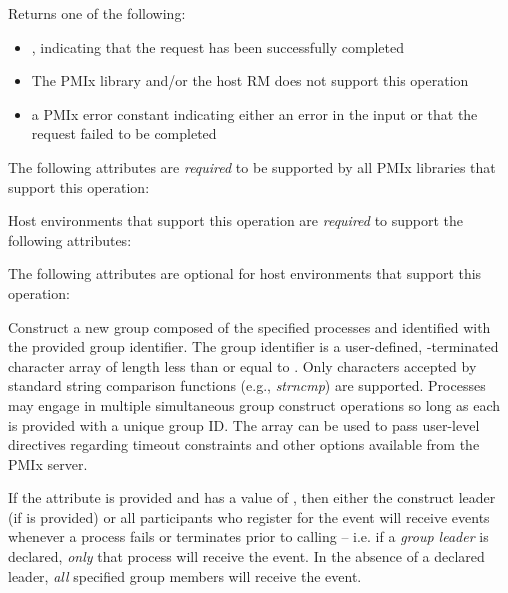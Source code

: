 Returns one of the following:

\begin{itemize}
    \item {}, indicating that the request has been successfully completed
    \item {} The \ac{PMIx} library and/or the host \ac{RM} does not support this operation
    \item a \ac{PMIx} error constant indicating either an error in the input or that the request failed to be completed
\end{itemize}

\reqattrstart
The following attributes are \textit{required} to be supported by all \ac{PMIx} libraries that support this operation:


Host environments that support this operation are \textit{required} to support the following attributes:


\reqattrend

\optattrstart
The following attributes are optional for host environments that support this operation:


\optattrend

\descr

Construct a new group composed of the specified processes and identified with the provided group identifier. The group identifier is a user-defined, -terminated character array of length less than or equal to . Only characters accepted by standard string comparison functions (e.g., \emph{strncmp}) are supported. Processes may engage in multiple simultaneous group construct operations so long as each is provided with a unique group ID. The  array can be used to pass user-level directives regarding timeout constraints and other options available from the \ac{PMIx} server.

If the  attribute is provided and has a value of , then either the construct leader (if  is provided) or all participants who register for the  event will receive events whenever a process fails or terminates prior to calling  – i.e. if a \emph{group leader} is declared, \textit{only} that process will receive the event. In the absence of a declared leader, \textit{all} specified group members will receive the event.

